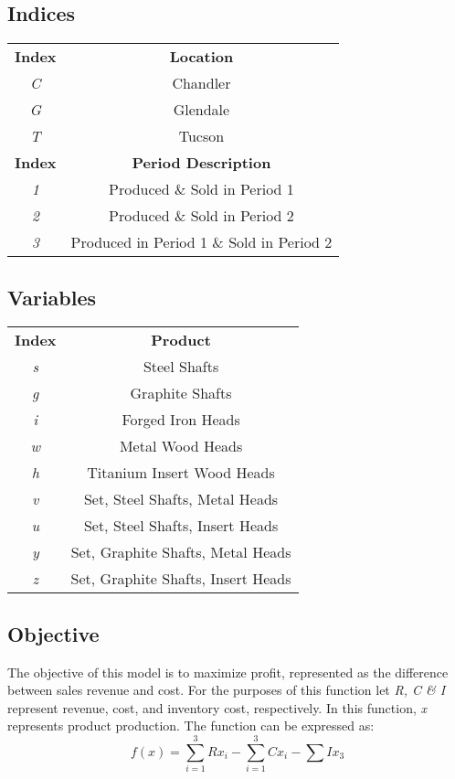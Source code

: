 \documentclass{article}
\begin{document}
\subsection{Indices}
\begin{tabular}{ c c }
\textbf{Index} & \textbf{Location} \\
\textit{C} & Chandler \\
\textit{G} & Glendale \\
\textit{T} & Tucson \\
\textbf{Index} & \textbf{Period Description} \\
\textit{1} & Produced \& Sold in Period 1 \\
\textit{2} & Produced \& Sold in Period 2 \\
\textit{3} & Produced in Period 1 \& Sold in Period 2 \\
\end{tabular}
\subsection{Variables}
\begin{tabular}{ c c }
\textbf{Index} & \textbf{Product} \\
\textit{s} & Steel Shafts \\
\textit{g} & Graphite Shafts \\
\textit{i} & Forged Iron Heads \\
\textit{w} & Metal Wood Heads \\
\textit{h} & Titanium Insert Wood Heads \\
\textit{v} & Set, Steel Shafts, Metal Heads \\
\textit{u} & Set, Steel Shafts, Insert Heads \\
\textit{y} & Set, Graphite Shafts, Metal Heads \\
\textit{z} & Set, Graphite Shafts, Insert Heads \\
\end{tabular}
\subsection{Objective}
The objective of this model is to maximize profit, represented as the difference between sales revenue and cost.  For the purposes of this function let \textit{R, C \& I} represent revenue, cost, and inventory cost, respectively.  In this function, \textit{x} represents product production.  The function can be expressed as:
$$f(x) = \sum_{i=1}^{3}Rx_{i} - \sum_{i=1}^{3}Cx_{i} - \sum Ix_{3} $$
\end{document}
